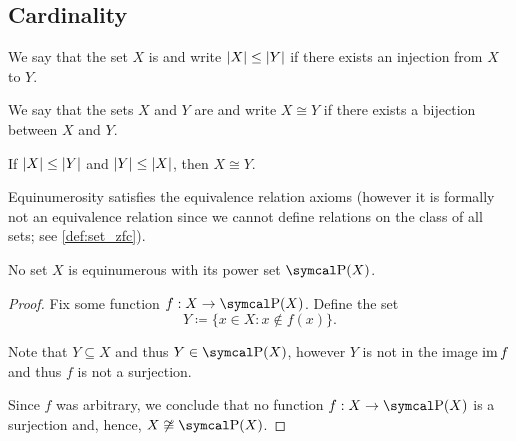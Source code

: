 \subsection{Cardinality}\label{subsec:cardinality}

\begin{definition}\label{def:set_domination}\cite[145]{Enderton1977}
  We say that the set \( X \) is  and write \( \left\vert X \right\vert \leq \left\vert Y \right\vert \) if there exists an injection from \( X \) to \( Y \).
\end{definition}

\begin{definition}\label{def:equinumerous_sets}\cite[129]{Enderton1977}
  We say that the sets \( X \) and \( Y \) are  and write \( X \cong Y \) if there exists a bijection between \( X \) and \( Y \).
\end{definition}

\begin{theorem}\label{thm:cantor_schroder_bernstein}\cite[147]{Enderton1977}
  If \( \left\vert X \right\vert \leq \left\vert Y \right\vert \) and \( \left\vert Y \right\vert \leq \left\vert X \right\vert \), then \( X \cong Y \).
\end{theorem}

\begin{proposition}\label{thm:equinumerousity_equivalence}\cite[theorem 6A]{Enderton1977}
  Equinumerosity satisfies the equivalence relation axioms (however it is formally not an equivalence relation since we cannot define relations on the class of all sets; see \cref{def:set_zfc}).
\end{proposition}

\begin{theorem}[Cantor]\label{thm:cantor_power_set_theorem}\cite[theorem 6B]{Enderton1977}
  No set \( X \) is equinumerous with its power set \( \Power(X) \).
\end{theorem}
\begin{proof}
  Fix some function \( f: X \to \Power(X) \). Define the set
  \begin{equation*}
    Y \coloneqq \{ x \in X \colon x \not\in f(x) \}.
  \end{equation*}

  Note that \( Y \subseteq X \) and thus \( Y \in \Power(X) \), however \( Y \) is not in the image \( \operatorname{im} f \) and thus \( f \) is not a surjection.

  Since \( f \) was arbitrary, we conclude that no function \( f: X \to \Power(X) \) is a surjection and, hence, \( X \not\cong \Power(X) \).
\end{proof}

